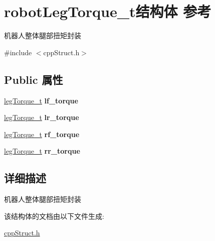 \hypertarget{structrobotLegTorque__t}{}\section{robot\+Leg\+Torque\+\_\+t结构体 参考}
\label{structrobotLegTorque__t}


机器人整体腿部扭矩封装  




{\ttfamily \#include $<$cpp\+Struct.\+h$>$}

\subsection*{Public 属性}
\begin{DoxyCompactItemize}
\item 
\mbox{\label{structrobotLegTorque__t_ae360858d24d87529f0bf689ad7ec7ef9}} 
\hyperlink{structlegTorque__t}{leg\+Torque\+\_\+t} {\bfseries lf\+\_\+torque}
\item 
\mbox{\label{structrobotLegTorque__t_aa2c19069ccb50aed5b22160db0b09671}} 
\hyperlink{structlegTorque__t}{leg\+Torque\+\_\+t} {\bfseries lr\+\_\+torque}
\item 
\mbox{\label{structrobotLegTorque__t_ad6a14f50acbdf3b91cb435f1acc1c2d7}} 
\hyperlink{structlegTorque__t}{leg\+Torque\+\_\+t} {\bfseries rf\+\_\+torque}
\item 
\mbox{\label{structrobotLegTorque__t_adaeebd977e83269e2529702b12dac487}} 
\hyperlink{structlegTorque__t}{leg\+Torque\+\_\+t} {\bfseries rr\+\_\+torque}
\end{DoxyCompactItemize}


\subsection{详细描述}
机器人整体腿部扭矩封装 

该结构体的文档由以下文件生成\+:\begin{DoxyCompactItemize}
\item 
\hyperlink{cppStruct_8h}{cpp\+Struct.\+h}\end{DoxyCompactItemize}
